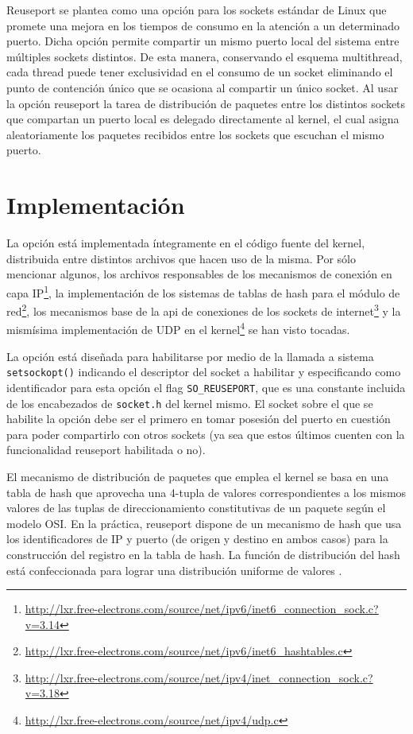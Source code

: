 Reuseport se plantea como una opción para los sockets estándar de Linux que promete una mejora en los tiempos de consumo en la atención a un determinado puerto. Dicha opción permite compartir un mismo puerto local del sistema entre múltiples sockets distintos. De esta manera, conservando el esquema multithread, cada thread puede tener exclusividad en el consumo de un socket eliminando el punto de contención único que se ocasiona al compartir un único socket. Al usar la opción reuseport la tarea de distribución de paquetes entre los distintos sockets que compartan un puerto local es delegado directamente al kernel, el cual asigna aleatoriamente los paquetes recibidos entre los sockets que escuchan el mismo puerto.

\section{Implementación}
La opción está implementada íntegramente en el código fuente del kernel, distribuida entre distintos archivos que hacen uso de la misma. Por sólo mencionar algunos, los archivos responsables de los mecanismos de conexión en capa IP\footnote{\url{http://lxr.free-electrons.com/source/net/ipv6/inet6_connection_sock.c?v=3.14}}, la implementación de los sistemas de tablas de hash para el módulo de red\footnote{\url{http://lxr.free-electrons.com/source/net/ipv6/inet6_hashtables.c}}, los mecanismos base de la api de conexiones de los sockets de internet\footnote{\url{http://lxr.free-electrons.com/source/net/ipv4/inet_connection_sock.c?v=3.18}} y la mismísima implementación de UDP en el kernel\footnote{\url{http://lxr.free-electrons.com/source/net/ipv4/udp.c}} se han visto tocadas.

La opción está diseñada para habilitarse por medio de la llamada a sistema \verb=setsockopt()= indicando el descriptor del socket a habilitar y especificando como identificador para esta opción el flag \verb=SO_REUSEPORT=, que es una constante incluida de los encabezados de \verb=socket.h= del kernel mismo. El socket sobre el que se habilite la opción debe ser el primero en tomar posesión del puerto en cuestión para poder compartirlo con otros sockets (ya sea que estos últimos cuenten con la funcionalidad reuseport habilitada o no).

El mecanismo de distribución de paquetes que emplea el kernel se basa en una tabla de hash que aprovecha una 4-tupla de valores correspondientes a los mismos valores de las tuplas de direccionamiento constitutivas de un paquete según el modelo OSI. En la práctica, reuseport dispone de un mecanismo de hash que usa los identificadores de IP y puerto (de origen y destino en ambos casos) para la construcción del registro en la tabla de hash. La función de distribución del hash está confeccionada para lograr una distribución uniforme de valores \cite{article:reuseport}.


